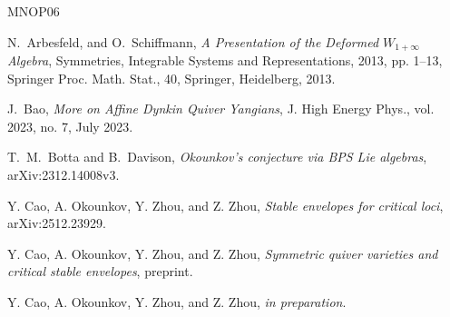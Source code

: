 \documentclass[10pt]{amsart}
\theoremstyle{definition}
\numberwithin{equation}{section}
\begin{document}
\begin{thebibliography}{MNOP06}






 N.~Arbesfeld, and O.~Schiffmann, \textit{A Presentation of the Deformed $W_{1+\infty}$ Algebra}, 
Symmetries, Integrable Systems and Representations, 2013, pp. 1--13, Springer Proc. Math. Stat., 40, Springer, Heidelberg, 2013.


 J.~Bao, \textit{More on Affine Dynkin Quiver Yangians}, J. High Energy Phys., vol. 2023, no. 7, July 2023.







T.~M.~Botta and B.~Davison, \textit{Okounkov's conjecture via BPS Lie algebras}, arXiv:2312.14008v3. 




 Y. Cao, A. Okounkov, Y. Zhou, and Z. Zhou, \textit{Stable envelopes for critical loci}, arXiv:2512.23929. 

 Y. Cao, A. Okounkov, Y. Zhou, and Z. Zhou, \textit{Symmetric quiver varieties and critical stable envelopes}, preprint. 


 Y. Cao, A. Okounkov, Y. Zhou, and Z. Zhou, \textit{in preparation}. 






\end{thebibliography}
\end{document}
